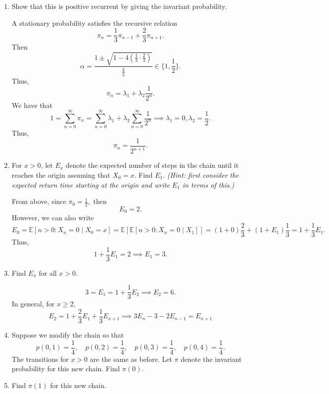 \documentclass[11pt]{article}
\newcommand{\bbE}{\mathbb{E}}
\begin{document}
\begin{enumerate}[label=(\alph*)]
    \item Show that this is positive recurrent by giving the invariant probability.
    \begin{solution}
A stationary probability satisfies the recursive relation
\[\pi_n = \frac{1}{3}\pi_{n-1} + \frac{2}{3}\pi_{n+1}.\] Then 
\[\alpha = \frac{1\pm \sqrt{1 - 4(\frac{1}{3}\cdot\frac{2}{3})}}{\frac{4}{3}} \in \{1, \frac{1}{2}\}.\]
Thus, 
\[\pi_n = \lambda_1 + \lambda_2\frac{1}{2^n}.\] We have that 
\[1 = \sum_{n=0}^\infty \pi_n = \sum_{n=0}^\infty \lambda_1 + \lambda_2\sum_{n=0}^\infty \frac{1}{2^n}\implies \lambda_1 = 0, \lambda_2 = \frac{1}{2}.\] Thus, 
\[\pi_n = \frac{1}{2^{n+1}}.\]
    \end{solution}
    
    \item For \(x>0\), let \(E_{x}\) denote the expected number of steps in the chain until it reaches the origin assuming that \(X_{0}=x\). Find \(E_{1}\). \textit{(Hint: first consider the expected return time starting at the origin and write \(E_{1}\) in terms of this.)}
\begin{solution}
    From above, since $\pi_0 = \frac{1}{2},$ then 
    \[E_0 = 2.\] However, we can also write 
    \[E_0 = \bbE[n >0: X_n = 0 \mid X_0 = x] = \bbE[\bbE[n>0 : X_n = 0 \mid X_1]] = (1 + 0)\frac{2}{3} + (1 + E_1)\frac{1}{3} = 1 + \frac{1}{3}E_1.\] Thus, 
    \[1 + \frac{1}{3}E_1 = 2 \implies E_1 = 3.\]
\end{solution}
    
    \item Find \(E_{x}\) for all \(x>0\).
\begin{solution}
    \[3 = E_1 = 1  + \frac{1}{3}E_{2} \implies E_2 = 6.\] In general, for $x \geq 2,$ 
    \[E_2 = 1 + \frac{2}{3}E_{1} + \frac{1}{3}E_{x+1}\implies 3E_n - 3 - 2E_{n-1} = E_{n+1}\]
\end{solution}
    
    \item Suppose we modify the chain so that
    \[
    p(0,1)=\frac{1}{4},\quad p(0,2)=\frac{1}{4},\quad p(0,3)=\frac{1}{4},\quad p(0,4)=\frac{1}{4}.
    \]
    The transitions for \(x>0\) are the same as before. Let \(\pi\) denote the invariant probability for this new chain. Find \(\pi(0)\).
    
    \item Find \(\pi(1)\) for this new chain.
\end{enumerate}
\end{document}
